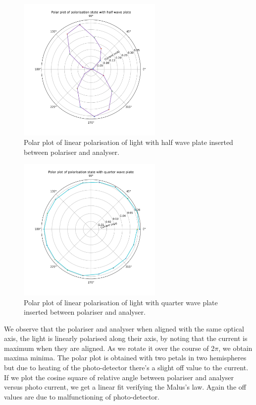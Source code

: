\documentclass[a4paper, amsfonts, amssymb, amsmath, reprint, showkeys, nofootinbib, twoside]{revtex4-1}
\begin{document}
\begin{figure}[H] %
	\centering
	\includegraphics[width=7cm,height=7cm]{6} 
	\caption{Polar plot of linear polarisation of light with half wave plate inserted between polariser and analyser. }
	\label{6}
\end{figure}

\begin{figure}[H] %
	\centering
	\includegraphics[width=7cm,height=7cm]{7} 
	\caption{Polar plot of linear polarisation of light with quarter wave plate inserted between polariser and analyser. }
	\label{7}
\end{figure}


We observe that the polariser and analyser when aligned with the same optical axis, the light is linearly polarised along their axis, by noting that the current is maximum when they are aligned. As we rotate it over the course of 2$\pi$, we obtain  maxima  minima. The polar plot is obtained with two petals in two hemispheres but due to heating of the photo-detector there's a slight off value to the current. If we plot the cosine square of relative angle between polariser and analyser versus photo current, we get a linear fit verifying the Malus's law. Again the off values are due to malfunctioning of photo-detector.
\end{document}
